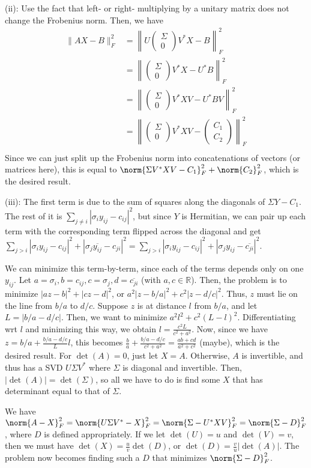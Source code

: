 \documentclass{article}
\newcommand{\conj}{\overline}
\newcommand{\openm}{\begin{pmatrix}}
\newcommand{\closem}{\end{pmatrix}}
\newcommand{\rn}{\mathbb{R}}
\begin{document}
\noindent(ii): Use the fact that left- or right- multiplying by a unitary matrix does not change the Frobenius norm. Then, we have
\begin{align*}
    \|AX-B\|_F^2&=\left\|U\openm\Sigma\\0\closem V^*X-B\right\|_F^2\\
                &=\left\|\openm\Sigma\\0\closem V^*X-U^*B\right\|_F^2\\
                &=\left\|\openm\Sigma\\0\closem V^*XV-U^*BV\right\|_F^2\\
                &=\left\|\openm\Sigma\\0\closem V^*XV-\openm C_1\\C_2\closem\right\|_F^2\\
\end{align*}
Since we can just split up the Frobenius norm into concatenations of vectors (or matrices here), this is equal to $\norm{\Sigma V^*XV-C_1}_F^2+\norm{C_2}_F^2$, which is the desired result.

\noindent(iii): The first term is due to the sum of squares along the diagonals of $\Sigma Y-C_1$. The rest of it is $\sum_{j\neq i}|\sigma_iy_{ij}-c_{ij}|^2$, but since $Y$ is Hermitian, we can pair up each term with the corresponding term flipped across the diagonal and get $\sum_{j>i}|\sigma_iy_{ij}-c_{ij}|^2+|\sigma_j\conj{y_{ij}}-c_{ji}|^2=\sum_{j>i}|\sigma_iy_{ij}-c_{ij}|^2+|\sigma_jy_{ij}-\conj{c_{ji}}|^2$. 

We can minimize this term-by-term, since each of the terms depends only on one $y_{ij}$. Let $a=\sigma_i, b=c_{ij}, c=\sigma_j, d=\conj{c_{ji}}$ (with $a,c\in\rn$). Then, the problem is to minimize $|az-b|^2+|cz-d|^2$, or $a^2|z-b/a|^2+c^2|z-d/c|^2$. Thus, $z$ must lie on the line from $b/a$ to $d/c$. Suppose $z$ is at distance $l$ from $b/a$, and let $L=|b/a-d/c|$. Then, we want to minimize $a^2l^2+c^2(L-l)^2$. Differentiating wrt $l$ and minimizing this way, we obtain $l=\frac{c^2L}{c^2+a^2}$. Now, since we have $z=b/a+\frac{b/a-d/c}{L}l$, this becomes $\frac{b}{a}+\frac{b/a-d/c}{c^2+a^2}=\frac{ab+cd}{a^2+c^2}$ (maybe), which is the desired result.
For $\det(A)=0$, just let $X=A$. Otherwise, $A$ is invertible, and thus has a SVD $U\Sigma V^*$ where $\Sigma$ is diagonal and invertible. Then, $|\det(A)|=\det(\Sigma)$, so all we have to do is find some $X$ that has determinant equal to that of $\Sigma$.

We have $\norm{A-X}_F^2=\norm{U\Sigma V^*-X}_F^2=\norm{\Sigma-U^*XV}_F^2=\norm{\Sigma-D}_F^2$, where $D$ is defined appropriately. If we let $\det(U)=u$ and $\det(V)=v$, then we must have $\det(X)=\frac{u}{v}\det(D)$, or $\det(D)=\frac{v}{u}|\det(A)|$. The problem now becomes finding such a $D$ that minimizes $\norm{\Sigma-D}_F^2$. 
\end{document}
